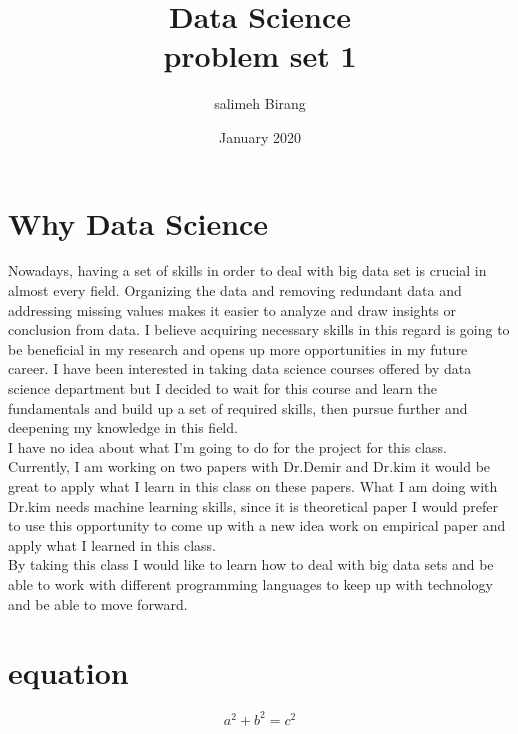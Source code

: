 \documentclass{article}
\title{Data Science\\ problem set 1}
\author{salimeh Birang }
\date{January 2020}
\begin{document}
\maketitle

\section{Why Data Science}
Nowadays, having a set of skills in order to deal with big data set is crucial in almost every field.  Organizing the data and removing redundant data and addressing missing values makes it easier to analyze and draw insights or conclusion from data. I believe acquiring necessary skills in this regard is going to be beneficial in my research and opens up more opportunities in my future career. I have been interested in taking data science courses offered by data science department but I decided to wait for this course and learn the fundamentals and build up a set of required skills, then pursue further and deepening my knowledge in this field. \\
I have no idea about what I'm going to do for the project for this class. Currently, I am working on two papers with Dr.Demir and Dr.kim it would be great to apply what I learn in this class on these papers. What I am doing with Dr.kim needs machine learning skills, since it is theoretical paper I would prefer to use this opportunity to come up with a new idea work on empirical paper and apply what I learned in this class.\\
By taking this class I would like to learn how to deal with big data sets and be able to work with different programming languages to keep up with technology and be able to move forward.


\section{equation}
\begin{equation}
    a^2+b^2=c^2
\end{equation}

%
%
\end{document}
